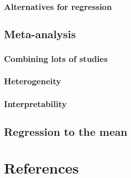 \documentclass[
  letterpaper,
  DIV=11,
  numbers=noendperiod]{scrreprt}
\newlength{\cslhangindent}
\newlength{\cslentryspacingunit} %
\newenvironment{CSLReferences}[2] %
 {%
  \setlength{\parindent}{0pt}
  \ifodd #1
  \let\oldpar\par
  \def\par{\hangindent=\cslhangindent\oldpar}
  \fi
  \setlength{\parskip}{#2\cslentryspacingunit}
 }%
 {}
\begin{document}
\hypertarget{alternatives-for-regression}{%
\subsection{Alternatives for
regression}\label{alternatives-for-regression}}

\hypertarget{meta-analysis}{%
\section{Meta-analysis}\label{meta-analysis}}

\hypertarget{combining-lots-of-studies}{%
\subsection{Combining lots of studies}\label{combining-lots-of-studies}}

\hypertarget{heterogeneity}{%
\subsection{Heterogeneity}\label{heterogeneity}}

\hypertarget{interpretability}{%
\subsection{Interpretability}\label{interpretability}}

\hypertarget{regression-to-the-mean}{%
\section{Regression to the mean}\label{regression-to-the-mean}}


\hypertarget{references}{%
\chapter*{References}\label{references}}


\hypertarget{refs}{}
\begin{CSLReferences}{0}{0}
\end{CSLReferences}
\end{document}
